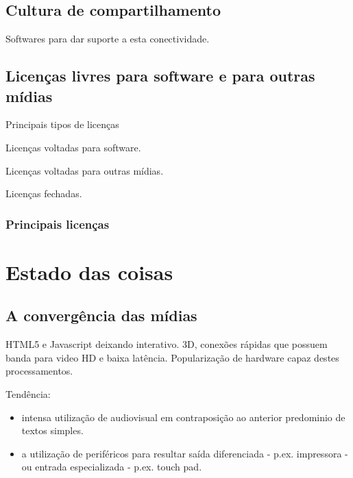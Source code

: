 \subsection{Cultura de compartilhamento} %
\label{sec:soft_compar} %

Softwares para dar suporte a esta conectividade.

\subsection{Licenças livres para software e para outras mídias}
\label{sec:licencas_livres}

Principais tipos de licenças

Licenças voltadas para software.

Licenças voltadas para outras mídias.

Licenças fechadas.

\subsubsection{Principais licenças}
\label{sec:princ_licencas}



\section{Estado das coisas}
\label{sec:context}


\subsection{A convergência das mídias}
\label{sec:midiamultimidia}

HTML5 e Javascript deixando interativo. 3D, conexões rápidas que possuem banda para video HD e
baixa latência. Popularização de hardware capaz destes processamentos.

Tendência: 
\begin{itemize}
    \item intensa utilização de audiovisual em contraposição ao
anterior predominio de textos simples.
    \item a utilização de periféricos para resultar saída diferenciada - p.ex.
impressora - ou entrada especializada - p.ex. touch pad.
\end{itemize}


